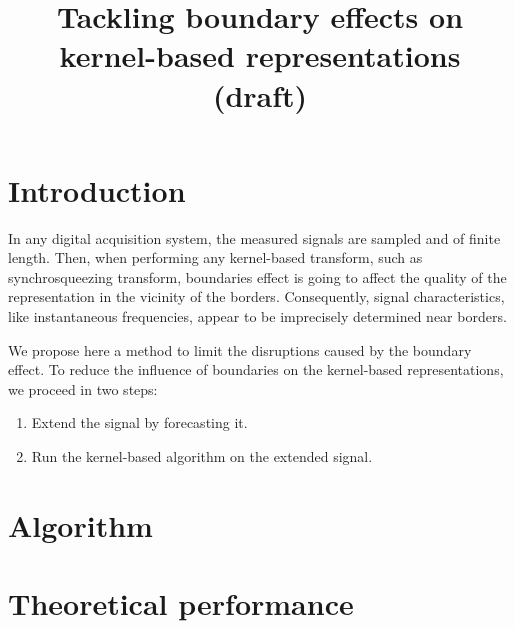 \documentclass[twoside,letterpaper]{article}
\title{Tackling boundary effects on kernel-based representations (draft)}
\date{}
\begin{document}
\maketitle

\section{Introduction}
In any digital acquisition system, the measured signals are sampled and of finite length. Then, when performing any kernel-based transform, such as synchrosqueezing transform, boundaries effect is going to affect the quality of the representation in the vicinity of the borders. Consequently, signal characteristics, like instantaneous frequencies, appear to be imprecisely determined near borders.

We propose here a method to limit the disruptions caused by the boundary effect. To reduce the influence of boundaries on the kernel-based representations, we proceed in two steps:
\begin{enumerate}
\item Extend the signal by forecasting it.
\item Run the kernel-based algorithm on the extended signal.
\end{enumerate}

\section{Algorithm}



\section{Theoretical performance}


%
\end{document}
